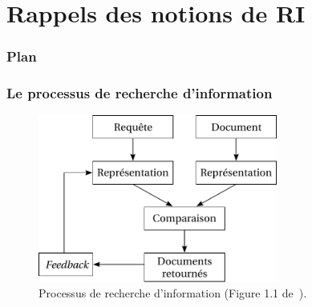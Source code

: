 \documentclass[12pt,aspectratio=43,dvipsnames,table]{beamer}
\begin{document}
\section{Rappels des notions de RI}


\begin{frame}
\frametitle{Plan}
\tableofcontents[sectionstyle=show,subsectionstyle=hide,subsubsectionstyle=hide]
\end{frame}


\begin{frame}
    \frametitle{Le processus de recherche d'information}
    \begin{figure}
    \centering
    \includegraphics[width=0.7\textwidth]{img/typicalIR.pdf}
    \caption{Processus de recherche d'information (Figure 1.1 
             de~\cite{DBLP:series/synthesis/2010Nie}).}
    \end{figure}
\end{frame}
\end{document}
